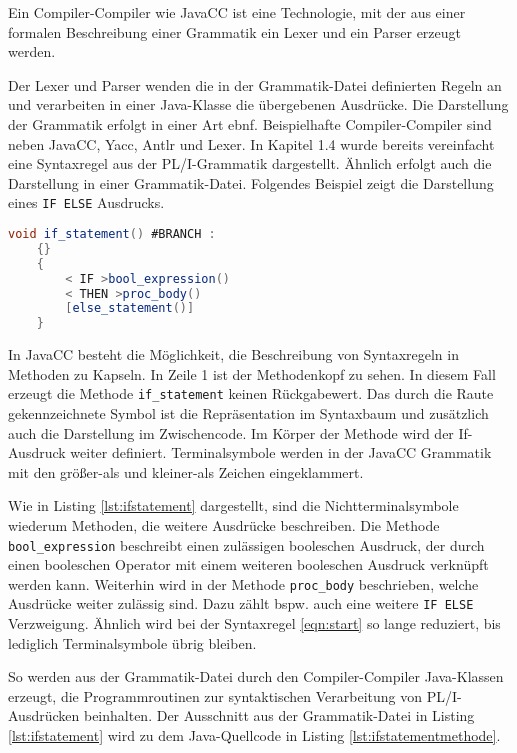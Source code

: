 Ein Compiler-Compiler wie JavaCC ist eine Technologie, mit der aus einer formalen Beschreibung einer Grammatik ein Lexer und ein Parser erzeugt werden. 

Der Lexer und Parser wenden die in der Grammatik-Datei definierten Regeln an und verarbeiten in einer Java-Klasse die übergebenen Ausdrücke.
Die Darstellung der Grammatik erfolgt in einer Art \ac{ebnf}.  Beispielhafte Compiler-Compiler sind neben JavaCC, Yacc, Antlr und Lexer. In Kapitel 1.4 wurde bereits vereinfacht eine Syntaxregel aus der PL/I-Grammatik dargestellt. Ähnlich erfolgt auch die Darstellung in einer Grammatik-Datei. Folgendes Beispiel zeigt die Darstellung eines \verb+IF ELSE+ Ausdrucks. 


\begin{lstlisting}[language=Java, caption=JavaCC Syntaxregel einer Verzweigung, label={lst:ifstatement}]
	void if_statement() #BRANCH :
	{}
	{
		< IF >bool_expression()
		< THEN >proc_body()
		[else_statement()]
	}
\end{lstlisting}

In JavaCC besteht die Möglichkeit, die Beschreibung von Syntaxregeln in Methoden zu Kapseln.
In Zeile 1 ist der Methodenkopf zu sehen. In diesem Fall erzeugt die Methode \verb+if_statement+ keinen Rückgabewert.
Das durch die Raute gekennzeichnete Symbol ist die Repräsentation im Syntaxbaum und zusätzlich auch die Darstellung im Zwischencode.
Im Körper der Methode wird der If-Ausdruck weiter definiert. Terminalsymbole werden in der JavaCC Grammatik mit den größer-als und kleiner-als Zeichen eingeklammert. 

Wie in Listing \ref{lst:ifstatement} dargestellt, sind die Nichtterminalsymbole wiederum Methoden, die  weitere Ausdrücke beschreiben. Die Methode \verb+bool_expression+ beschreibt einen zulässigen booleschen Ausdruck, der durch einen booleschen Operator mit einem weiteren booleschen Ausdruck verknüpft werden kann. Weiterhin wird in der Methode \verb+proc_body+ beschrieben, welche Ausdrücke weiter zulässig sind. Dazu zählt bspw. auch eine weitere \verb+IF ELSE+ Verzweigung. Ähnlich wird bei der Syntaxregel \ref{eqn:start} so lange reduziert, bis lediglich Terminalsymbole übrig bleiben.

So werden aus der Grammatik-Datei durch den Compiler-Compiler Java-Klassen erzeugt, die Programmroutinen zur syntaktischen Verarbeitung von PL/I-Ausdrücken beinhalten.
Der Ausschnitt aus der Grammatik-Datei in Listing \ref{lst:ifstatement} wird zu dem Java-Quellcode in Listing \ref{lst:ifstatementmethode}.
\pagebreak

